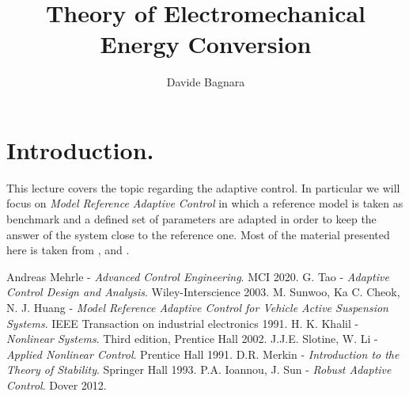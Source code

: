\documentclass[11pt,a4paper]{scrartcl}
\title{Theory of Electromechanical Energy Conversion}
\author{Davide Bagnara}
\numberwithin{equation}{section}
\theoremstyle{it}
\theoremstyle{definition}
\theoremstyle{it}
\begin{document}
	\maketitle
	\thispagestyle{firstpage}
	\tableofcontents
	\listoffigures	
	\listoftables		

\section{Introduction.} 
This lecture covers the topic regarding the adaptive control. In particular we will focus on \textit{Model Reference Adaptive Control} in which a reference model is taken as benchmark and a defined set of parameters are adapted in order to keep the answer of the system close to the reference one. Most of the material presented here is taken from \cite{p18}, \cite{p25} and \cite{p23}.


\begin{thebibliography}{99}
	 Andreas Mehrle - \textit{Advanced Control Engineering}. MCI 2020.
	 G. Tao - \textit{Adaptive Control Design and Analysis}. Wiley-Interscience 2003.
	 M. Sunwoo, Ka C. Cheok, N. J. Huang - \textit{Model Reference Adaptive Control for Vehicle Active Suspension Systems}. IEEE Transaction on industrial electronics 1991.		
	 H. K. Khalil - \textit{Nonlinear Systems}. Third edition, Prentice Hall 2002.
	 J.J.E. Slotine, W. Li - \textit{Applied Nonlinear Control}. Prentice Hall 1991.
	 D.R. Merkin - \textit{Introduction to the Theory of Stability}. Springer Hall 1993.
	 P.A. Ioannou, J. Sun - \textit{Robust Adaptive Control}. Dover 2012.
\end{thebibliography}

	
\end{document}
